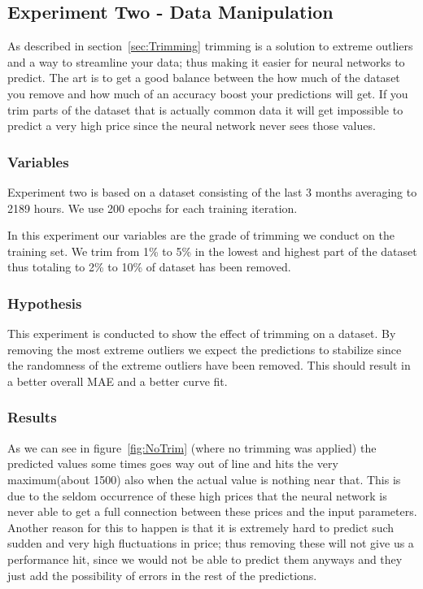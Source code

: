 \newpage
\subsection{Experiment Two - Data Manipulation}
\label{sec:priceExperimentTwo}
As described in section~\ref{sec:Trimming} trimming is a solution to extreme outliers and a way to streamline your data; thus making it easier for neural networks to predict. The art is to get a good balance between the how much of the dataset you remove and how much of an accuracy boost your predictions will get. If you trim parts of the dataset that is actually common data it will get impossible to predict a very high price since the neural network never sees those values.

\subsubsection{Variables}
Experiment two is based on a dataset consisting of the last 3 months averaging to 2189 hours. We use 200 epochs for each training iteration.

In this experiment our variables are the grade of trimming we conduct on the training set. We trim from 1\% to 5\% in the lowest and highest part of the dataset thus totaling to 2\% to 10\% of dataset has been removed.

\subsubsection{Hypothesis}
This experiment is conducted to show the effect of trimming on a dataset. By removing the most extreme outliers we expect the predictions to stabilize since the randomness of the extreme outliers have been removed. This should result in a better overall MAE and a better curve fit.

\subsubsection{Results}

As we can see in figure~\ref{fig:NoTrim} (where no trimming was applied) the predicted values some times goes way out of line and hits the very maximum(about 1500) also when the actual value is nothing near that. This is due to the seldom occurrence of these high prices that the neural network is never able to get a full connection between these prices and the input parameters. Another reason for this to happen is that it is extremely hard to predict such sudden and very high fluctuations in price; thus removing these will not give us a performance hit, since we would not be able to predict them anyways and they just add the possibility of errors in the rest of the predictions.


